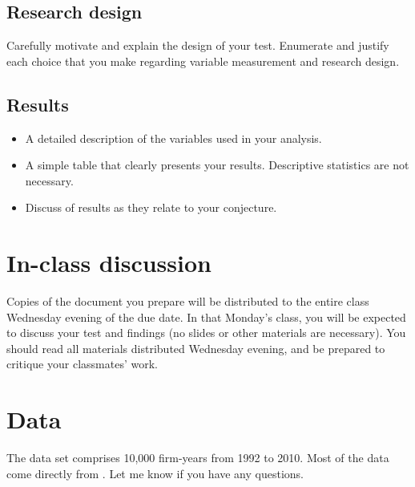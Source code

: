 \documentclass[11pt]{amsart}
\theoremstyle{definition}
\theoremstyle{question}
\begin{document}
\subsection{Research design}
Carefully motivate and explain the design of your test. 
Enumerate and justify each choice that you make regarding  variable measurement and research design. 

\subsection{Results}
\begin{itemize}
	\item A detailed description of the variables used in your analysis. 
	\item A simple table that clearly presents your results. Descriptive statistics are not necessary.
	\item Discuss of results as they relate to your conjecture.
\end{itemize}

\section{In-class discussion}
Copies of the document you prepare will be distributed to the entire class Wednesday evening of the due date. 
In that Monday's class, you will be expected to discuss your test and findings (no slides or other materials are necessary). 
You should read all materials distributed Wednesday evening, and be prepared to critique your classmates' work.

\section{Data}
The data set comprises 10,000 firm-years from 1992 to 2010. 
Most of the data come directly from \citet{Armstrong:2013hs}. 
Let me know if you have any questions.
\end{document}
